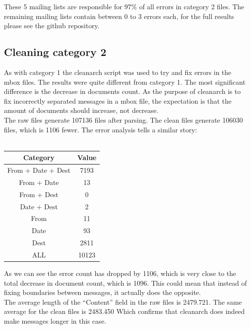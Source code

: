 \documentclass[a4paper,english]{report}
\begin{document}
These 5 mailing lists are responsible for 97\% of all errors in category 2 files. The remaining mailing lists contain between 0 to 3 errors each, for the full results please see the github repository.



\subsection{Cleaning category 2 }

As with category 1 the cleanarch script was used to try and fix errors in the mbox files.
The results were quite different from category 1. The most significant difference is the decrease in documents count. As the purpose of cleanarch is to fix incorrectly separated messages in a mbox file, the expectation is that the amount of documents should increase, not decrease.\\

The raw files generate 107136 files after parsing.
The clean files generate 106030 files, which is 1106 fewer.
\noindent
The error analysis tells a similar story:\\\\

\begin{center}
 \begin{tabular}{|c | c|}
 \hline
 Category & Value \\ [0.5ex]
 \hline\hline
From + Date + Dest & 7193\\
\hline
From + Date & 13\\
\hline
From + Dest & 0\\
\hline
Date + Dest & 2\\
\hline
From & 11\\
\hline
Date & 93\\
\hline
Dest & 2811\\
\hline
ALL & 10123\\
\hline
\end{tabular}
\end{center}


As we can see the error count has dropped by 1106, which is very close to the total decrease in document count, which is 1096.
This could mean that instead of fixing boundaries between messages, it actually does the opposite.\\

\noindent
The average length of the “Content” field in the raw files is 2479.721.
\noindent
The same average for the clean files is 2483.450
\noindent
Which confirms that cleanarch does indeed make messages longer in this case.\\
\end{document}
